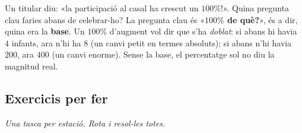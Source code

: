 \begin{exresolt}
Un titular diu: «la participació al casal ha crescut un $100\%$!». Quina pregunta
clau faries abans de celebrar-ho?
\solucio
La pregunta clau és «\textbf{$100\%$ de què?}», és a dir, quina era la \textbf{base}.
Un $100\%$ d'augment vol dir que s'ha \emph{doblat}: si abans hi havia $4$ infants,
ara n'hi ha $8$ (un canvi petit en termes absoluts); si abans n'hi havia $200$, ara
$400$ (un canvi enorme). Sense la base, el percentatge sol no diu la magnitud real.
\end{exresolt}

\subsection{Exercicis per fer}

\noindent\textit{Una tasca per estació. Rota i resol-les totes.}

